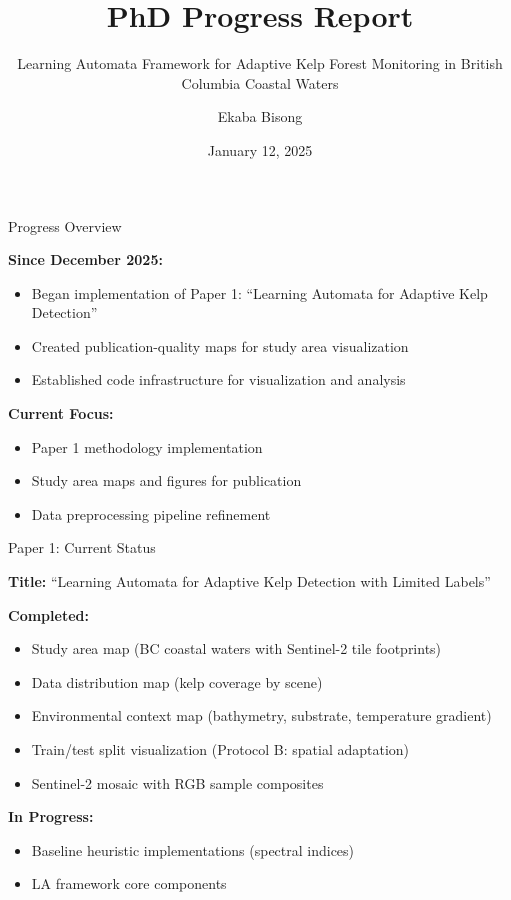 \documentclass[10pt,xcolor={table,dvipsnames},t]{beamer}
\title[PhD Progress Report]{PhD Progress Report}
\subtitle{Learning Automata Framework for Adaptive Kelp Forest Monitoring in British Columbia Coastal Waters}
\author{Ekaba Bisong}
\institute{Department of Computer Science\\University of Victoria}
\date{January 12, 2025}
\begin{document}
\begin{frame}
  \titlepage
\end{frame}

\begin{frame}{Progress Overview}

\textbf{Since December 2025:}
\begin{itemize}
  \item Began implementation of Paper 1: ``Learning Automata for Adaptive Kelp Detection''
  \item Created publication-quality maps for study area visualization
  \item Established code infrastructure for visualization and analysis
\end{itemize}

\vspace{0.5em}
\textbf{Current Focus:}
\begin{itemize}
  \item Paper 1 methodology implementation
  \item Study area maps and figures for publication
  \item Data preprocessing pipeline refinement
\end{itemize}

\end{frame}

\begin{frame}{Paper 1: Current Status}

\textbf{Title:} ``Learning Automata for Adaptive Kelp Detection with Limited Labels''

\vspace{0.5em}
\textbf{Completed:}
\begin{itemize}
  \item Study area map (BC coastal waters with Sentinel-2 tile footprints)
  \item Data distribution map (kelp coverage by scene)
  \item Environmental context map (bathymetry, substrate, temperature gradient)
  \item Train/test split visualization (Protocol B: spatial adaptation)
  \item Sentinel-2 mosaic with RGB sample composites
\end{itemize}

\vspace{0.5em}
\textbf{In Progress:}
\begin{itemize}
  \item Baseline heuristic implementations (spectral indices)
  \item LA framework core components
\end{itemize}

\end{frame}
\end{document}
